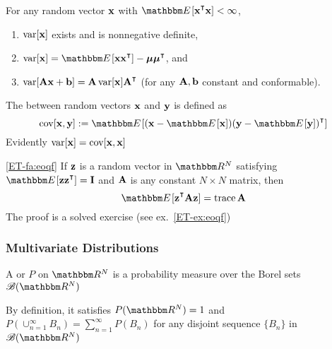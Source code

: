 \begin{frame}

    \vspace{2em}
    \Fact
    For any random vector ${\mathbf x}$ with $\EE[ \boldx^\T\boldx ] < \infty$,
    \begin{enumerate}
        \item $\operatorname{var} [{\mathbf x}]$ exists and is nonnegative definite,
        \item $\var[\boldx] = \EE [\boldx \boldx^\T] - \boldmu \boldmu^\T$,
            and
        \item $\var[\boldA \boldx + \boldb] = \boldA \var[\boldx] \boldA^\T$
            \;\; (for any $\mathbf A, {\mathbf b}$ constant and conformable).
    \end{enumerate}
    
\end{frame}


\begin{frame}

    \vspace{2em}
    The  between random vectors ${\mathbf x}$ and
    ${\mathbf y}$ is defined as 
    \begin{equation*}
        \cov [\boldx, \boldy]
        := \EE [ (\boldx - \EE [\boldx]) (\boldy - \EE [\boldy])^\T]
    \end{equation*}
    Evidently $\operatorname{var}[{\mathbf x}] = \operatorname{cov}[{\mathbf x}, {\mathbf x}]$
        
    \vspace{1em}
    \Fact\eqref{ET-fa:eoqf}
        If ${\mathbf z}$ is a random vector in $\RR^N$ satisfying $\EE[\boldz
        \boldz^\T] = \boldI$ and $\mathbf A$ is any constant $N \times N$ matrix, then 
        \begin{equation*}
            \EE[\boldz^\T \boldA \boldz] = \trace \boldA
        \end{equation*}
    The proof is a solved exercise (see ex.~\ref{ET-ex:eoqf})
    
\end{frame}

\begin{frame}\frametitle{Multivariate Distributions}

    \vspace{2em}
    A  or  $P$ on $\RR^N$ is a probability measure
    over the Borel sets $\bB(\RR^N)$
    
    \vspace{1em}    
    By definition, it satisfies
    $P(\RR^N) = 1$ and $P(\cup_{n=1}^{\infty} B_n) = \sum_{n=1}^\infty
    P(B_n)$ for any disjoint sequence $\{B_n\}$ in $\bB(\RR^N)$
    
\end{frame}

